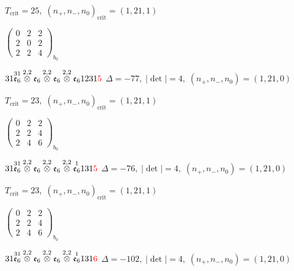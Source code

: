 \documentclass[10pt]{article}
\begin{document}
\hspace{1em}$T_{\text{crit}}=25,\; (n_+,n_-,n_0)_{\text{crit}}=(1,21,1)$

\hspace{2em}$\left(\begin{smallmatrix}0 & 2 & 2 \\ 2 & 0 & 2 \\ 2 & 2 & 4\end{smallmatrix}\right)_{\!b_0}$

\smallskip

$31\overset{31}{\mathfrak{e}_6}\overset{2,2}{\otimes}\mathfrak{e}_6\overset{2,2}{\otimes}\mathfrak{e}_6\overset{2,2}{\otimes}\mathfrak{e}_61231\textcolor{red}{5}$ \quad $\Delta=-77,\; |\det|=4,\; (n_+,n_-,n_0)=(1,21,0)$

\hspace{1em}$T_{\text{crit}}=23,\; (n_+,n_-,n_0)_{\text{crit}}=(1,21,1)$

\hspace{2em}$\left(\begin{smallmatrix}0 & 2 & 2 \\ 2 & 2 & 4 \\ 2 & 4 & 6\end{smallmatrix}\right)_{\!b_0}$

\smallskip

$31\overset{31}{\mathfrak{e}_6}\overset{2,2}{\otimes}\mathfrak{e}_6\overset{2,2}{\otimes}\mathfrak{e}_6\overset{2,2}{\otimes}\overset{1}{\mathfrak{e}_6}131\textcolor{red}{5}$ \quad $\Delta=-76,\; |\det|=4,\; (n_+,n_-,n_0)=(1,21,0)$

\hspace{1em}$T_{\text{crit}}=23,\; (n_+,n_-,n_0)_{\text{crit}}=(1,21,1)$

\hspace{2em}$\left(\begin{smallmatrix}0 & 2 & 2 \\ 2 & 2 & 4 \\ 2 & 4 & 6\end{smallmatrix}\right)_{\!b_0}$

$31\overset{31}{\mathfrak{e}_6}\overset{2,2}{\otimes}\mathfrak{e}_6\overset{2,2}{\otimes}\mathfrak{e}_6\overset{2,2}{\otimes}\overset{1}{\mathfrak{e}_6}131\textcolor{red}{6}$ \quad $\Delta=-102,\; |\det|=4,\; (n_+,n_-,n_0)=(1,21,0)$
\end{document}
